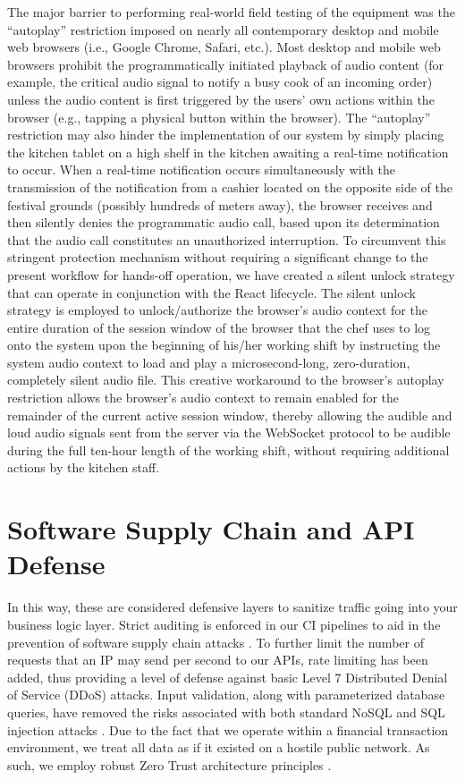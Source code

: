 The major barrier to performing real-world field testing of the equipment was the ``autoplay'' restriction imposed on nearly all contemporary desktop and mobile web browsers (i.e., Google Chrome, Safari, etc.). Most desktop and mobile web browsers prohibit the programmatically initiated playback of audio content (for example, the critical audio signal to notify a busy cook of an incoming order) unless the audio content is first triggered by the users' own actions within the browser (e.g., tapping a physical button within the browser).
The ``autoplay'' restriction may also hinder the implementation of our system by simply placing the kitchen tablet on a high shelf in the kitchen awaiting a real-time notification to occur. When a real-time notification occurs simultaneously with the transmission of the notification from a cashier located on the opposite side of the festival grounds (possibly hundreds of meters away), the browser receives and then silently denies the programmatic audio call, based upon its determination that the audio call constitutes an unauthorized interruption. To circumvent this stringent protection mechanism without requiring a significant change to the present workflow for hands-off operation, we have created a silent unlock strategy that can operate in conjunction with the React lifecycle.
The silent unlock strategy is employed to unlock/authorize the browser's audio context for the entire duration of the session window of the browser that the chef uses to log onto the system upon the beginning of his/her working shift by instructing the system audio context to load and play a microsecond-long, zero-duration, completely silent audio file. This creative workaround to the browser's autoplay restriction allows the browser's audio context to remain enabled for the remainder of the current active session window, thereby allowing the audible and loud audio signals sent from the server via the WebSocket protocol to be audible during the full ten-hour length of the working shift, without requiring additional actions by the kitchen staff.

\section{Software Supply Chain and API Defense}

In this way, these are considered defensive layers to sanitize traffic going into your business logic layer. Strict auditing is enforced in our CI pipelines to aid in the prevention of software supply chain attacks \cite{sonatype2024supplychain}. To further limit the number of requests that an IP may send per second to our APIs, rate limiting has been added, thus providing a level of defense against basic Level 7 Distributed Denial of Service (DDoS) attacks. Input validation, along with parameterized database queries, have removed the risks associated with both standard NoSQL and SQL injection attacks \cite{owasp2025}. Due to the fact that we operate within a financial transaction environment, we treat all data as if it existed on a hostile public network. As such, we employ robust Zero Trust architecture principles \cite{nist2020zero}.

